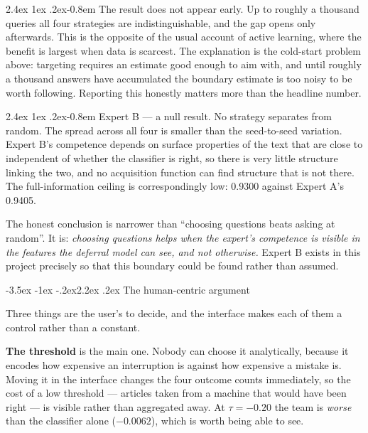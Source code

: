 \documentclass[11pt,a4paper]{article}
\makeatletter
\renewcommand\section{\@startsection{section}{1}{\z@}%
  {-3.5ex \@plus -1ex \@minus -.2ex}{2.2ex \@plus.2ex}%
  {\normalfont\Large\sffamily\bfseries\color{accent}}}
\renewcommand\paragraph{\@startsection{paragraph}{4}{\z@}%
  {2.4ex \@plus1ex \@minus.2ex}{-0.8em}%
  {\normalfont\normalsize\sffamily\bfseries\color{black}}}
\newenvironment{callout}
  {\par\medskip\begin{lrbox}{\calloutbuf}%
   \begin{minipage}{\dimexpr\linewidth-24pt\relax}\setlength{\parskip}{0.4em}}
  {\end{minipage}\end{lrbox}%
   \noindent\colorbox{notebg}{\hspace{4pt}\usebox{\calloutbuf}\hspace{4pt}}\par\medskip}
\makeatother
\begin{document}
\paragraph{The result does not appear early.} Up to roughly a thousand queries
all four strategies are indistinguishable, and the gap opens only afterwards.
This is the opposite of the usual account of active learning, where the benefit
is largest when data is scarcest. The explanation is the cold-start problem
above: targeting requires an estimate good enough to aim with, and until roughly a
thousand answers have accumulated the boundary estimate is too noisy to be worth
following. Reporting this honestly matters more than the headline number.

\paragraph{Expert B --- a null result.} No strategy separates from random. The
spread across all four is smaller than the seed-to-seed variation. Expert B's
competence depends on surface properties of the text that are close to
independent of whether the classifier is right, so there is very little
structure linking the two, and no acquisition function can find structure that is
not there. The full-information ceiling is correspondingly low: 0.9300 against
Expert A's 0.9405.

\begin{callout}
The honest conclusion is narrower than ``choosing questions beats asking at
random''. It is: \emph{choosing questions helps when the expert's competence is
visible in the features the deferral model can see, and not otherwise.} Expert B
exists in this project precisely so that this boundary could be found rather than
assumed.
\end{callout}

\section{The human-centric argument}

Three things are the user's to decide, and the interface makes each of them a
control rather than a constant.

\textbf{The threshold} is the main one. Nobody can choose it analytically,
because it encodes how expensive an interruption is against how expensive a
mistake is. Moving it in the interface changes the four outcome counts
immediately, so the cost of a low threshold --- articles taken from a machine
that would have been right --- is visible rather than aggregated away. At
$\tau = -0.20$ the team is \emph{worse} than the classifier alone
($-0.0062$), which is worth being able to see.
\end{document}
